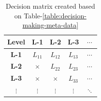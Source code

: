 \begin{table}
    \begin{tabular}{ |c|c|c|c|c| }
        \hline
        \hspace*{4.1mm}\textbf{Level}\hspace*{4.1mm} & \hspace*{4.1mm}\textbf{L-1}\hspace*{4.1mm} & \hspace*{4.1mm}\textbf{L-2}\hspace*{4.1mm} & \hspace*{4.1mm}\textbf{L-3}\hspace*{4.1mm} & \hspace*{4mm}$\cdots$\hspace*{4mm} \\
        \hline
        \textbf{L-1} & $L_{11}$ & $L_{12}$ & $L_{13}$ & $\cdots$ \\
        \hline
        \textbf{L-2} & $\times$ & $L_{22}$ & $L_{23}$ & $\cdots$ \\
        \hline
        \textbf{L-3} &  $\times$ &  $\times$ & $L_{33}$ & $\cdots$ \\
        \hline
        $\vdots$ &  $\vdots$ &  $\vdots$ & $\vdots$ & $\ddots$ \\
        \hline
    \end{tabular}
    \caption{Decision matrix created based on Table-\ref{table:decision-making-meta-data}}
    \label{table:decision-matrix}
\end{table}    

